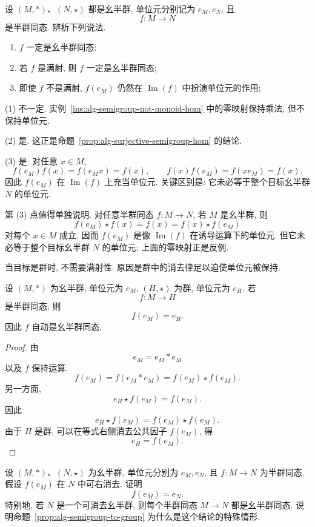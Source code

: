 \documentclass[usesamecnt, thmcnt=section, lang=cn, newtx, 10pt, scheme=chinese]{elegantbook}
\begin{document}
\begin{concept}\label{con:alg-hom-levels}
设 $(M,*)$、$(N,\star)$ 都是幺半群, 单位元分别记为 $e_M,e_N$, 且
\[
 f:M\longrightarrow N
\]
是半群同态. 辨析下列说法.
\begin{enumerate}[label=\rm(\arabic*)]
  \item $f$ 一定是幺半群同态;
  \item 若 $f$ 是满射, 则 $f$ 一定是幺半群同态;
  \item 即使 $f$ 不是满射, $f(e_M)$ 仍然在 $\operatorname{Im}(f)$ 中扮演单位元的作用;
\end{enumerate}
\end{concept}

\begin{solution}
(1) 不一定. 实例~\ref{ins:alg-semigroup-not-monoid-hom} 中的零映射保持乘法, 但不保持单位元.

(2) 是. 这正是命题~\ref{prop:alg-surjective-semigroup-hom} 的结论.

(3) 是. 对任意 $x\in M$,
\[
 f(e_M)f(x)=f(e_Mx)=f(x),
 \qquad
 f(x)f(e_M)=f(xe_M)=f(x).
\]
因此 $f(e_M)$ 在 $\operatorname{Im}(f)$ 上充当单位元. 关键区别是: 它未必等于整个目标幺半群 $N$ 的单位元.
\end{solution}

第 (3) 点值得单独说明. 对任意半群同态 $f:M\to N$, 若 $M$ 是幺半群, 则
\[
 f(e_M)\star f(x)=f(x)=f(x)\star f(e_M)
\]
对每个 $x\in M$ 成立. 因而 $f(e_M)$ 是像 $\operatorname{Im}(f)$ 在诱导运算下的单位元. 但它未必等于整个目标幺半群 $N$ 的单位元; 上面的零映射正是反例.

当目标是群时, 不需要满射性. 原因是群中的消去律足以迫使单位元被保持.

\begin{proposition}\label{prop:alg-semigroup-to-group}
设 $(M,*)$ 为幺半群, 单位元为 $e_M$, $(H,\star)$ 为群, 单位元为 $e_H$. 若
\[
 f:M\longrightarrow H
\]
是半群同态, 则
\[
 f(e_M)=e_H.
\]
因此 $f$ 自动是幺半群同态.
\end{proposition}

\begin{proof}
由
\[
 e_M=e_M*e_M
\]
以及 $f$ 保持运算,
\[
 f(e_M)
 =f(e_M*e_M)
 =f(e_M)\star f(e_M).
\]
另一方面,
\[
 e_H\star f(e_M)=f(e_M).
\]
因此
\[
 e_H\star f(e_M)
 =
 f(e_M)\star f(e_M).
\]
由于 $H$ 是群, 可以在等式右侧消去公共因子 $f(e_M)$, 得
\[
 e_H=f(e_M).
\]
\end{proof}

\begin{exercise}\label{ex:alg-semigroup-hom-unit}
设 $(M,*)$、$(N,\star)$ 为幺半群, 单位元分别为 $e_M,e_N$, 且 $f:M\to N$ 为半群同态. 假设 $f(e_M)$ 在 $N$ 中可右消去. 证明
\[
 f(e_M)=e_N.
\]
特别地, 若 $N$ 是一个可消去幺半群, 则每个半群同态 $M\to N$ 都是幺半群同态. 说明命题~\ref{prop:alg-semigroup-to-group} 为什么是这个结论的特殊情形.
\end{exercise}
\end{document}
